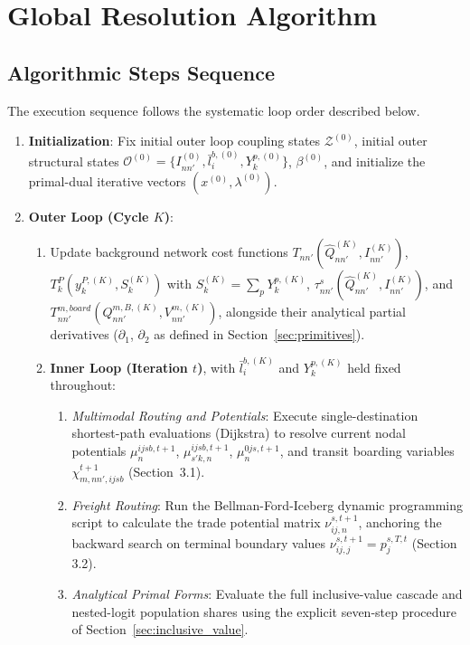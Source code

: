 \documentclass[11pt,a4paper]{article}
\begin{document}
\section{Global Resolution Algorithm}
\label{sec:global_algo}

\subsection{Algorithmic Steps Sequence}

The execution sequence follows the systematic loop order described below.
\begin{enumerate}
    \item \textbf{Initialization}: Fix initial outer loop coupling states $\mathcal{Z}^{(0)}$, initial outer structural states $\mathcal{O}^{(0)} = \{I_{nn'}^{(0)}, \bar l_i^{b,(0)}, Y_k^{p,(0)}\}$, $\beta^{(0)}$, and initialize the primal-dual iterative vectors $(x^{(0)}, \lambda^{(0)})$.
    \item \textbf{Outer Loop (Cycle $K$)}:
    \begin{enumerate}
        \item Update background network cost functions $T_{nn'}(\hat Q_{nn'}^{(K)}, I_{nn'}^{(K)})$, $T^P_k(y_k^{P,(K)}, S_k^{(K)})$ with $S_k^{(K)} = \sum_{p}Y_k^{p,(K)}$, $\tau^s_{nn'}(\hat Q_{nn'}^{(K)}, I_{nn'}^{(K)})$, and $T_{nn'}^{m,board}(Q_{nn'}^{m,B,(K)}, V_{nn'}^{m,(K)})$, alongside their analytical partial derivatives ($\partial_1$, $\partial_2$ as defined in Section~\ref{sec:primitives}).
        \item \textbf{Inner Loop (Iteration $t$)}, with $\bar l_i^{b,(K)}$ and $Y_k^{p,(K)}$ held fixed throughout:
        \begin{enumerate}
            \item \textit{Multimodal Routing and Potentials}: Execute single-destination shortest-path evaluations (Dijkstra) to resolve current nodal potentials $\mu_n^{ijsb, t+1}$, $\mu^{ijsb, t+1}_{s'k,n}$, $\mu^{0js, t+1}_n$, and transit boarding variables $\chi_{m,nn',ijsb}^{t+1}$ (Section~3.1).
            \item \textit{Freight Routing}: Run the Bellman-Ford-Iceberg dynamic programming script to calculate the trade potential matrix $\nu^{s, t+1}_{ij,n}$, anchoring the backward search on terminal boundary values $\nu_{ij,j}^{s,t+1} = p_j^{s,T,t}$ (Section 3.2).

            \item \textit{Analytical Primal Forms}: Evaluate the full inclusive-value cascade and nested-logit population shares using the explicit seven-step procedure of Section~\ref{sec:inclusive_value}.


\end{enumerate}
\end{enumerate}
\end{enumerate}
\end{document}
